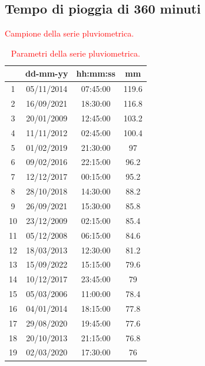 \subsection{Tempo di pioggia di 360 minuti}

\begin{table}[H]
    \begin{minipage}{.5\linewidth}
      \caption{\textcolor{red}{Campione della serie pluviometrica.}}
      \centering
        \begin{tabular}{cccc}
            \toprule
            & dd-mm-yy   & hh:mm:ss & mm  \\
         \midrule
         1  & 05/11/2014 & 07:45:00 & 119.6 \\
         2  & 16/09/2021 & 18:30:00 & 116.8 \\
         3  & 20/01/2009 & 12:45:00 & 103.2 \\
         4  & 11/11/2012 & 02:45:00 & 100.4 \\
         5  & 01/02/2019 & 21:30:00 & 97    \\
         6  & 09/02/2016 & 22:15:00 & 96.2  \\
         7  & 12/12/2017 & 00:15:00 & 95.2  \\
         8  & 28/10/2018 & 14:30:00 & 88.2  \\
         9  & 26/09/2021 & 15:30:00 & 85.8  \\
         10 & 23/12/2009 & 02:15:00 & 85.4  \\
         11 & 05/12/2008 & 06:15:00 & 84.6  \\
         12 & 18/03/2013 & 12:30:00 & 81.2  \\
         13 & 15/09/2022 & 15:15:00 & 79.6  \\
         14 & 10/12/2017 & 23:45:00 & 79    \\
         15 & 05/03/2006 & 11:00:00 & 78.4  \\
         16 & 04/01/2014 & 18:15:00 & 77.8  \\
         17 & 29/08/2020 & 19:45:00 & 77.6  \\
         18 & 20/10/2013 & 21:15:00 & 76.8  \\
         19 & 02/03/2020 & 17:30:00 & 76    \\
         \bottomrule
        \end{tabular}
    \end{minipage}%
    \begin{minipage}{.5\linewidth}
      \centering
        \caption{\textcolor{red}{Parametri della serie pluviometrica.}}

\end{minipage}
\end{table}
